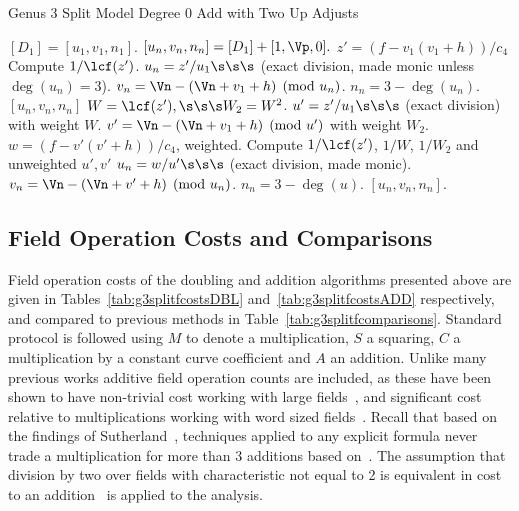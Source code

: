 \begin{algorithm}[H]
\caption{Genus 3 Split Model Degree 0 Add with Two Up Adjusts\label{alg:g3explSPLIT0ADDUP2}}
\begin{algorithmic} [1]
\Require $[D_1] = [u_1, v_1, n_1]$. \smallskip
\Ensure $[u_n,v_n,n_n] = [D_1] + [1,\Vp,0].$
\algrule
\State $z' = (f - v_1(v_1 + h))/c_4$
    \State Compute $1/\lcf(z')$.
    \State $u_n = z'/u_1 \s\s\s$ (exact division, made monic unless $\deg(u_n) = 3$).
    \State $v_n = \Vn - (\Vn + v_1 + h) \pmod{u_n}$.
    \State $n_n = 3 - \deg(u_n)$.
    \Return $[u_n,v_n,n_n]$
\EndIf
\State $W = \lcf(z'), \s\s\s W_2 = W^2$.
\State $u' = z'/u_1 \s\s\s$ (exact division) with weight $W$.
\State $v' = \Vn - (\Vn + v_1 + h) \pmod{u'}$ with weight $W_2$.
\State $w = (f - v'(v' + h))/c_4$, weighted.
\State Compute $1/\lcf(z')$, $1/W$, $1/W_2$ and unweighted $u',v'$
\State $u_n = w/u' \s\s\s$ (exact division, made monic).
\State $v_n = \Vn - (\Vn + v' + h) \pmod{u_n}$.
\State $n_n = 3 - \deg(u)$.
\State \Return $[u_n,v_n,n_n]$.
\end{algorithmic}
\end{algorithm}





\subsection{Field Operation Costs and Comparisons}
\label{sec:g3splitFieldCosts}
Field operation costs of the doubling and addition algorithms presented above
are given in Tables~\ref{tab:g3splitfcostsDBL} and~\ref{tab:g3splitfcostsADD}
respectively, and compared to previous methods in
Table~\ref{tab:g3splitfcomparisons}. Standard protocol is followed using $M$ to
denote a multiplication, $S$ a squaring, $C$ a multiplication by a constant
curve coefficient and $A$ an addition. Unlike many previous works additive field
operation counts are included, as these have been shown to have non-trivial cost
working with large fields~\cite{HisilCostello_jaccoord_2014}, and significant
cost relative to multiplications working with word sized
fields~\cite{Sutherland_sato_2016}. Recall that based on the findings of
Sutherland~\cite{Sutherland_sato_2016,Sutherland_g3_2019}, techniques applied to
any explicit formula never trade a multiplication for more than 3 additions
based on~\cite{Sutherland_sato_2016}. The assumption that division by two over
fields with characteristic not equal to 2 is equivalent in cost to an
addition~\cite{Sutherland_g3_2019} is applied to the analysis.


